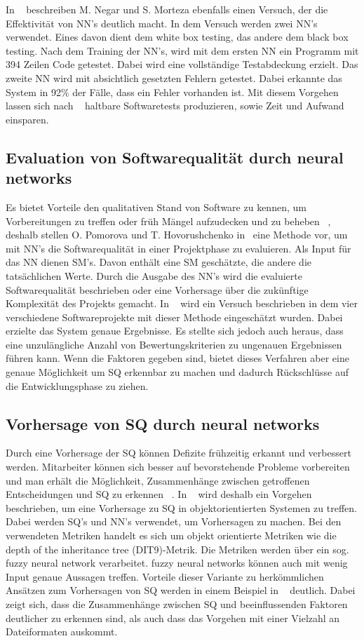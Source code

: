 \noindent In ~\cite{Majma2014} beschreiben M. Negar und S. Morteza ebenfalls einen Versuch, der die Effektivität von NN's deutlich macht. In dem Versuch werden zwei NN's verwendet. Eines davon dient dem white box testing, das andere dem black box testing. Nach dem Training der NN's, wird mit dem ersten NN ein Programm mit 394 Zeilen Code getestet. Dabei wird eine vollständige Testabdeckung erzielt. Das zweite NN wird mit absichtlich gesetzten Fehlern getestet. Dabei erkannte das System in 92\% der Fälle, dass ein Fehler vorhanden ist. Mit diesem Vorgehen lassen sich nach ~\cite{Majma2014} haltbare Softwaretests produzieren, sowie Zeit und Aufwand einsparen.

\subsection{Evaluation von Softwarequalität durch neural networks}
Es bietet Vorteile den qualitativen Stand von Software zu kennen, um Vorbereitungen zu treffen oder früh Mängel aufzudecken und zu beheben ~\cite{Pomorova2013}, deshalb stellen O. Pomorova und T. Hovorushchenko in~\cite{Pomorova2013} eine Methode vor, um mit NN's die Softwarequalität in einer Projektphase zu evaluieren. Als Input für das NN dienen SM's. Davon enthält eine SM geschätzte, die andere die tatsächlichen Werte.
Durch die Ausgabe des NN's wird die evaluierte Softwarequalität beschrieben oder eine Vorhersage über die zukünftige Komplexität des Projekts gemacht. 
In ~\cite{Pomorova2013} wird ein Versuch beschrieben in dem vier verschiedene Softwareprojekte mit dieser Methode eingeschätzt wurden. Dabei erzielte das System genaue Ergebnisse. Es stellte sich jedoch auch heraus, dass eine unzulängliche Anzahl von Bewertungskriterien zu ungenauen Ergebnissen führen kann.
Wenn die Faktoren gegeben sind, bietet dieses Verfahren aber eine genaue Möglichkeit um SQ erkennbar zu machen und dadurch Rückschlüsse auf die Entwicklungsphase zu ziehen.

\subsection{Vorhersage von SQ durch neural networks}
Durch eine Vorhersage der SQ können Defizite frühzeitig erkannt und verbessert werden. Mitarbeiter können sich besser auf bevorstehende Probleme vorbereiten und man erhält die Möglichkeit, Zusammenhänge zwischen getroffenen Entscheidungen und SQ zu erkennen ~\cite{Peng2009}. In ~\cite{Peng2009} wird deshalb ein Vorgehen beschrieben, um eine Vorhersage zu SQ in objektorientierten Systemen zu treffen. Dabei werden SQ's und NN's verwendet, um Vorhersagen zu machen. Bei den verwendeten Metriken handelt es sich um objekt orientierte Metriken wie die depth of the inheritance tree (DIT9)-Metrik. Die Metriken werden über ein sog. fuzzy neural network verarbeitet. fuzzy neural networks können auch mit wenig Input genaue Aussagen treffen.
Vorteile dieser Variante zu herkömmlichen Ansätzen zum Vorhersagen von SQ werden in einem Beispiel in ~\cite{Peng2009} deutlich. Dabei zeigt sich, dass die Zusammenhänge zwischen SQ und beeinflussenden Faktoren deutlicher zu erkennen sind, als auch dass das Vorgehen mit einer Vielzahl an Dateiformaten auskommt.

